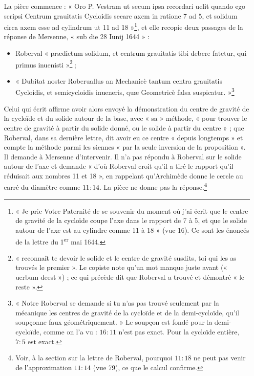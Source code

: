 \documentclass[11pt,a4paper]{article}
\begin{document}
La pièce commence : « Oro P. Vestram ut secum ipsa recordari uelit quando ego
scripsi Centrum grauitatis Cycloidis secare axem in ratione 7 ad 5, et solidum
circa axem esse ad cylindrum ut 11 ad 18 »\footnote{« Je prie Votre Paternité de
se souvenir du moment où j'ai écrit que le centre de gravité de la cycloïde coupe
l'axe dans le rapport de 7 à 5, et que le solide autour de l'axe est au cylindre
comme 11 à 18 » (vue 16). Ce sont les énoncés de la lettre du
1\textsuperscript{er} mai 1644.}, et elle recopie deux passages de la réponse de
Mersenne, « sub die 28 Iunij 1644 » :

\begin{itemize}
  \item Roberval « prædictum solidum, et centrum grauitatis tibi debere fatetur,
    qui primus inuenisti »\footnote{« reconnaît te devoir le solide et le centre
    de gravité susdits, toi qui les as trouvés le premier ». Le copiste note
    qu'un mot manque juste avant (« uerbum deest ») ; ce qui précède dit que
    Roberval a trouvé et démontré « le reste ».} ;
  \item « Dubitat noster Roberuallus an Mechanicè tantum centra grauitatis
    Cycloidis, et semicycloidis inueneris, quæ Geometricè falsa
    suspicatur. »\footnote{« Notre Roberval se demande si tu n'as pas trouvé
    seulement par la mécanique les centres de gravité de la cycloïde et de la
    demi-cycloïde, qu'il soupçonne faux géométriquement. » Le soupçon est fondé
    pour la demi-cycloïde, comme on l'a vu : $16:11$ n'est pas exact. Pour la
    cycloïde entière, $7:5$ est exact.}
\end{itemize}

Celui qui écrit affirme avoir alors envoyé la démonstration du centre de
gravité de la cycloïde et du solide autour de la base, avec « sa » méthode,
« pour trouver le centre de gravité à partir du solide donné, ou le solide à
partir du centre » ; que Roberval, dans sa dernière lettre, dit avoir eu ce
centre « depuis longtemps » et compte la méthode parmi les siennes « par la seule
inversion de la proposition ». Il demande à Mersenne d'intervenir. Il n'a pas
répondu à Roberval sur le solide autour de l'axe et demande « d'où Roberval
croit qu'il a tiré le rapport qu'il réduisait aux nombres 11 et 18 », en
rappelant qu'Archimède donne le cercle au carré du diamètre comme $11:14$. La
pièce ne donne pas la réponse.\footnote{Voir, à la section sur la lettre de
Roberval, pourquoi $11:18$ ne peut pas venir de l'approximation $11:14$ (vue
79), ce que le calcul confirme.}
\end{document}
